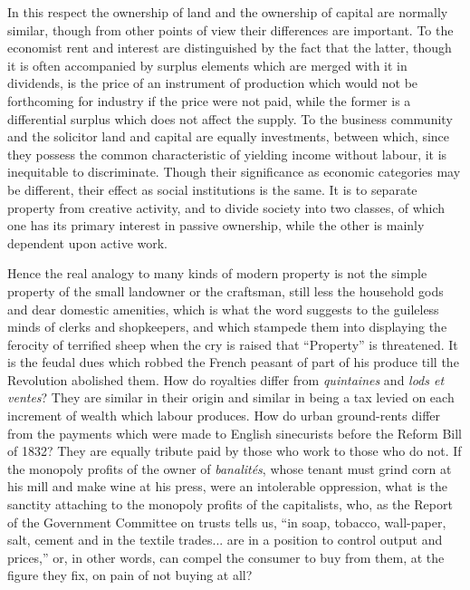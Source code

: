 \documentclass{book}
\begin{document}
In this respect the ownership of land and the ownership of capital are normally similar, though from other points of view their differences are important. To the economist rent and interest are distinguished by the fact that the latter, though it is often accompanied by surplus elements which are merged with it in dividends, is the price of an instrument of production which would not be forthcoming for industry if the price were not paid, while the former is a differential surplus which does not affect the supply. To the business community and the solicitor land and capital are equally investments, between which, since they possess the common characteristic of yielding income without labour, it is inequitable to discriminate. Though their significance as economic categories may be different, their effect as social institutions is the same. It is to separate property from creative activity, and to divide society into two classes, of which one has its primary interest in passive ownership, while the other is mainly dependent upon active work.

Hence the real analogy to many kinds of modern property is not the simple property of the small landowner or the craftsman, still less the household gods and dear domestic amenities, which is what the word suggests to the guileless minds of clerks and shopkeepers, and which stampede them into displaying the ferocity of terrified sheep when the cry is raised that “Property” is threatened. It is the feudal dues which robbed the French peasant of part of his produce till the Revolution abolished them. How do royalties differ from \emph{quintaines} and \emph{lods et ventes}? They are similar in their origin and similar in being a tax levied on each increment of wealth which labour produces. How do urban ground-rents differ from the payments which were made to English sinecurists before the Reform Bill of 1832? They are equally tribute paid by those who work to those who do not. If the monopoly profits of the owner of \emph{banalités}, whose tenant must grind corn at his mill and make wine at his press, were an intolerable oppression, what is the sanctity attaching to the monopoly profits of the capitalists, who, as the Report of the Government Committee on trusts tells us, “in soap, tobacco, wall-paper, salt, cement and in the textile trades... are in a position to control output and prices,” or, in other words, can compel the consumer to buy from them, at the figure they fix, on pain of not buying at all?
\end{document}
